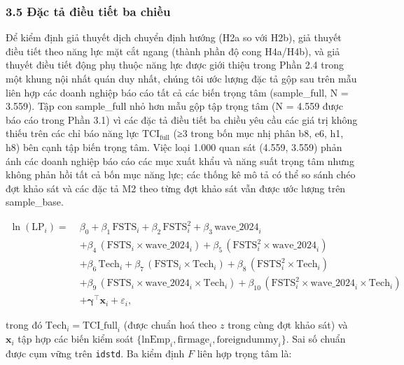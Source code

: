 \documentclass[12pt,a4paper]{article}
\begin{document}
\hypertarget{35-ux111ux1eb7c-tux1ea3-ux111iux1ec1u-tiux1ebft-ba-chiux1ec1u}{%
\subsubsection{3.5 Đặc tả điều tiết ba
chiều}\label{35-ux111ux1eb7c-tux1ea3-ux111iux1ec1u-tiux1ebft-ba-chiux1ec1u}}

Để kiểm định giả thuyết dịch chuyển định hướng (H2a so với H2b), giả
thuyết điều tiết theo năng lực mặt cắt ngang (thành phần độ cong
H4a/H4b), và giả thuyết điều tiết động phụ thuộc năng lực được giới
thiệu trong Phần 2.4 trong một khung nội nhất quán duy nhất, chúng tôi
ước lượng đặc tả gộp sau trên mẫu liên hợp các doanh nghiệp báo cáo tất
cả các biến trọng tâm (sample\_full, N = 3.559). Tập con sample\_full
nhỏ hơn mẫu gộp tập trọng tâm (N = 4.559 được báo cáo trong Phần 3.1) vì
các đặc tả điều tiết ba chiều yêu cầu các giá trị không thiếu trên các
chỉ báo năng lực \(\mathrm{TCI}_{\text{full}}\) (≥3 trong bốn mục nhị
phân b8, e6, h1, h8) bên cạnh tập biến trọng tâm. Việc loại 1.000 quan
sát (4.559, 3.559) phản ánh các doanh nghiệp báo cáo các mục xuất khẩu
và năng suất trọng tâm nhưng không phản hồi tất cả bốn mục năng lực; các
thống kê mô tả có thể so sánh chéo đợt khảo sát và các đặc tả M2 theo
từng đợt khảo sát vẫn được ước lượng trên sample\_base.

\[
\begin{aligned}
\ln(\mathrm{LP}_i) =\;& \beta_0 + \beta_1\,\mathrm{FSTS}_i + \beta_2\,\mathrm{FSTS}_i^2 + \beta_3\,\mathrm{wave\_2024}_i \\
& + \beta_4\,(\mathrm{FSTS}_i \times \mathrm{wave\_2024}_i) + \beta_5\,(\mathrm{FSTS}_i^2 \times \mathrm{wave\_2024}_i) \\
& + \beta_6\,\mathrm{Tech}_i + \beta_7\,(\mathrm{FSTS}_i \times \mathrm{Tech}_i) + \beta_8\,(\mathrm{FSTS}_i^2 \times \mathrm{Tech}_i) \\
& + \beta_9\,(\mathrm{FSTS}_i \times \mathrm{wave\_2024}_i \times \mathrm{Tech}_i) + \beta_{10}\,(\mathrm{FSTS}_i^2 \times \mathrm{wave\_2024}_i \times \mathrm{Tech}_i) \\
& + \boldsymbol{\gamma}^{\top}\!\mathbf{x}_i + \varepsilon_i,
\end{aligned}
\]

trong đó \(\mathrm{Tech}_i = \mathrm{TCI\_full}_i\) (được chuẩn hoá theo
\(z\) trong cùng đợt khảo sát) và \(\mathbf{x}_i\) tập hợp các biến kiểm
soát
\(\{\mathrm{lnEmp}_i, \mathrm{firmage}_i, \mathrm{foreigndummy}_i\}\).
Sai số chuẩn được cụm vững trên \texttt{idstd}. Ba kiểm định \(F\) liên
hợp trọng tâm là:
\end{document}
